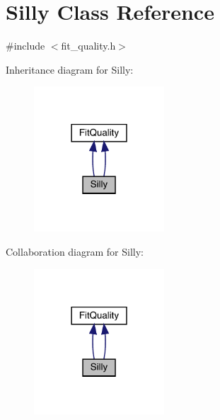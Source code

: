 \hypertarget{classSilly}{}\section{Silly Class Reference}
\label{classSilly}


{\ttfamily \#include $<$fit\+\_\+quality.\+h$>$}



Inheritance diagram for Silly\+:
\nopagebreak
\begin{figure}[H]
\begin{center}
\leavevmode
\includegraphics[width=138pt]{da/d1a/classSilly__inherit__graph}
\end{center}
\end{figure}


Collaboration diagram for Silly\+:
\nopagebreak
\begin{figure}[H]
\begin{center}
\leavevmode
\includegraphics[width=138pt]{d6/d52/classSilly__coll__graph}
\end{center}
\end{figure}
